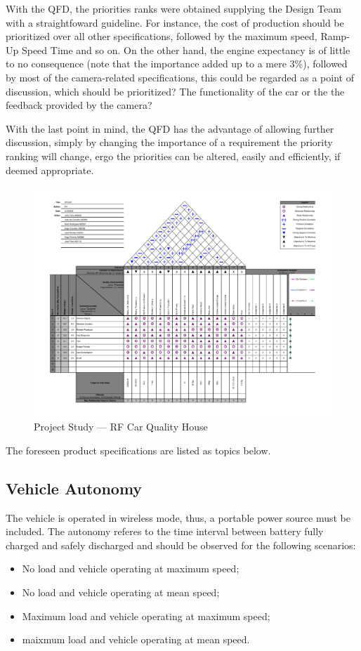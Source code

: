 With the QFD, the priorities ranks were obtained supplying the Design Team with a
straightfoward guideline. For instance, the cost of production should be
prioritized over all other specifications, followed by the maximum speed,
Ramp-Up Speed Time and so on.  On the other hand, the engine expectancy is of
little to no consequence (note that the importance added up to a mere 3\%),
followed by most of the camera-related specifications, this could be regarded as
a point of discussion, which should be prioritized? The functionality of the car
or the the feedback provided by the camera?

With the last point in mind, the QFD has the advantage of allowing further
discussion, simply by changing the importance of a requirement the priority ranking will change, ergo
the priorities can be altered, easily and efficiently, if deemed appropriate.
%
\begin{figure}[!htbp]
   \centering
       \includegraphics[page=1,width=1.0\textwidth]{sec/pdf/QFD_v3.pdf} 
 \caption{Project Study --- RF Car Quality House}%
\label{fig:QFD}
\end{figure}
\newpage
The foreseen product specifications are listed as topics below.

\subsection{Vehicle Autonomy}%
\label{sec:autonomy-specs}
The vehicle is operated in wireless mode, thus, a portable power source must be included. The autonomy referes to the time interval between battery fully charged and safely discharged and should be observed for the following scenarios:
\begin{itemize}
\item No load and vehicle operating at maximum speed;
\item No load and vehicle operating at mean speed;
\item Maximum load and vehicle operating at maximum speed;
\item maixmum load and vehicle operating at mean speed.
\end{itemize}
